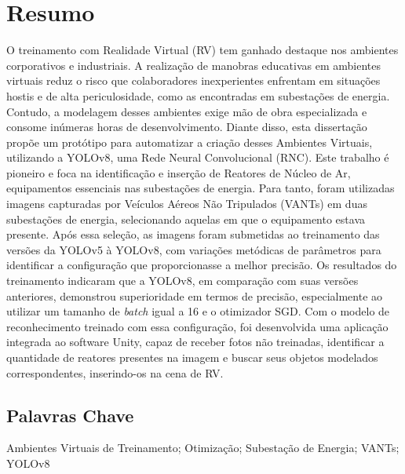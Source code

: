 \newpage
\thispagestyle{empty}
\chapter*{Resumo}
\vspace{-35pt}

O treinamento com Realidade Virtual (RV) tem ganhado destaque nos ambientes corporativos e industriais. A realização de manobras educativas em ambientes virtuais reduz o risco que colaboradores inexperientes enfrentam em situações hostis e de alta periculosidade, como as encontradas em subestações de energia. Contudo, a modelagem desses ambientes exige mão de obra especializada e consome inúmeras horas de desenvolvimento. Diante disso, esta dissertação propõe um protótipo para automatizar a criação desses Ambientes Virtuais, utilizando a YOLOv8, uma Rede Neural Convolucional (RNC). Este trabalho é pioneiro e foca na identificação e inserção de Reatores de Núcleo de Ar, equipamentos essenciais nas subestações de energia. Para tanto, foram utilizadas imagens capturadas por Veículos Aéreos Não Tripulados (VANTs) em duas subestações de energia, selecionando aquelas em que o equipamento estava presente. Após essa seleção, as imagens foram submetidas ao treinamento das versões da YOLOv5 à YOLOv8, com variações metódicas de parâmetros para identificar a configuração que proporcionasse a melhor precisão. Os resultados do treinamento indicaram que a YOLOv8, em comparação com suas versões anteriores, demonstrou superioridade em termos de precisão, especialmente ao utilizar um tamanho de \textit{batch} igual a 16 e o otimizador SGD. Com o modelo de reconhecimento treinado com essa configuração, foi desenvolvida uma aplicação integrada ao software Unity, capaz de receber fotos não treinadas, identificar a quantidade de reatores presentes na imagem e buscar seus objetos modelados correspondentes, inserindo-os na cena de RV.

\section*{Palavras Chave}
Ambientes Virtuais de Treinamento; Otimização; Subestação de Energia; VANTs; YOLOv8
\newpage


